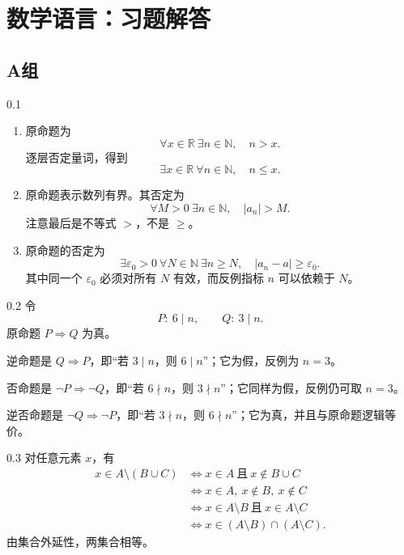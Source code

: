 \chapter{数学语言：习题解答}

\section*{A组}

\begin{solution}{0.1}
\begin{enumerate}[label=(\arabic*)]
  \item 原命题为
  \[
    \forall x\in\mathbb R\ \exists n\in\mathbb N,\quad n>x.
  \]
  逐层否定量词，得到
  \[
    \exists x\in\mathbb R\ \forall n\in\mathbb N,\quad n\le x.
  \]

  \item 原命题表示数列有界。其否定为
  \[
    \forall M>0\ \exists n\in\mathbb N,\quad |a_n|>M.
  \]
  注意最后是不等式 \(>\)，不是 \(\ge\)。

  \item 原命题的否定为
  \[
    \exists\varepsilon_0>0\ \forall N\in\mathbb N\
    \exists n\ge N,\quad |a_n-a|\ge\varepsilon_0.
  \]
  其中同一个 \(\varepsilon_0\) 必须对所有 \(N\) 有效，而反例指标 \(n\) 可以依赖于 \(N\)。
\end{enumerate}
\end{solution}

\begin{solution}{0.2}
令
\[
  P:\ 6\mid n,\qquad Q:\ 3\mid n.
\]
原命题 \(P\Rightarrow Q\) 为真。

逆命题是 \(Q\Rightarrow P\)，即“若 \(3\mid n\)，则 \(6\mid n\)”；它为假，反例为 \(n=3\)。

否命题是 \(\neg P\Rightarrow\neg Q\)，即“若 \(6\nmid n\)，则 \(3\nmid n\)”；它同样为假，反例仍可取 \(n=3\)。

逆否命题是 \(\neg Q\Rightarrow\neg P\)，即“若 \(3\nmid n\)，则 \(6\nmid n\)”；它为真，并且与原命题逻辑等价。
\end{solution}

\begin{solution}{0.3}
对任意元素 \(x\)，有
\[
\begin{aligned}
x\in A\setminus(B\cup C)
&\Leftrightarrow x\in A\ \text{且}\ x\notin B\cup C\\
&\Leftrightarrow x\in A,\ x\notin B,\ x\notin C\\
&\Leftrightarrow x\in A\setminus B\ \text{且}\ x\in A\setminus C\\
&\Leftrightarrow x\in(A\setminus B)\cap(A\setminus C).
\end{aligned}
\]
由集合外延性，两集合相等。
\end{solution}

